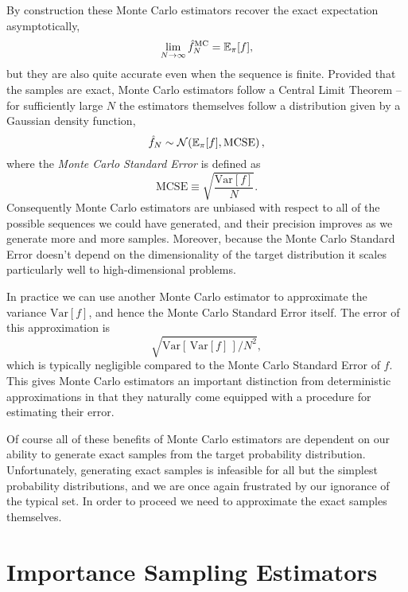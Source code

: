 By construction these Monte Carlo estimators recover the exact
expectation asymptotically,
%
\begin{equation*}
\lim_{N \rightarrow \infty} \hat{f}^{\mathrm{MC}}_{N}
=
\mathbb{E}_{\pi} [ f ],
\end{equation*}
%
but they are also quite accurate even when the sequence is finite.
Provided that the samples are exact, Monte Carlo estimators 
follow a Central Limit Theorem -- for sufficiently large $N$ the 
estimators themselves follow a distribution given by a Gaussian 
density function,
%
\begin{equation*}
\hat{f}_{N} \sim 
\mathcal{N} \! \left( \mathbb{E}_{\pi} [ f ],
\mathrm{MCSE} \right),
\end{equation*}
%
where the \emph{Monte Carlo Standard Error} is defined as
%
\begin{equation*}
\mathrm{MCSE } \equiv \sqrt{ \frac{ \mathrm{Var} [ f ] }{N} }.
\end{equation*}
%
Consequently Monte Carlo estimators are unbiased with respect
to all of the possible sequences we could have generated, and 
their precision improves as we generate more and more samples.
Moreover, because the Monte Carlo Standard Error doesn't depend 
on the dimensionality of the target distribution it scales particularly 
well to high-dimensional problems.

In practice we can use another Monte Carlo estimator to approximate 
the variance $\mathrm{Var} [ f ] $, and hence the Monte Carlo Standard
Error itself.  The error of this approximation is
%
\begin{equation*}
\sqrt{\mathrm{Var} [ \, \mathrm{Var} [ f ]  \, ] / N^{2} },
\end{equation*}
%
which is typically negligible compared to the Monte Carlo Standard Error 
of $f$.  This gives Monte Carlo estimators an important distinction from
deterministic approximations in that they naturally come equipped with 
a procedure for estimating their error.

Of course all of these benefits of Monte Carlo estimators are dependent 
on our ability to generate exact samples from the target probability 
distribution.  Unfortunately, generating exact samples is infeasible for all 
but the simplest probability distributions, and we are once again frustrated 
by our ignorance of the typical set.  In order to proceed we need to 
approximate the exact samples themselves.

\section{Importance Sampling Estimators}

